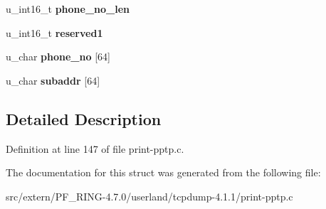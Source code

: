 \begin{DoxyCompactItemize}
\item 
\hypertarget{structpptp__msg__ocrq_a3cafb2efb818633c4bdeeb138cfbe914}{
u\_\-int16\_\-t {\bfseries phone\_\-no\_\-len}}
\label{structpptp__msg__ocrq_a3cafb2efb818633c4bdeeb138cfbe914}

\item 
\hypertarget{structpptp__msg__ocrq_a12994a612bcee3c23eef93816e906e11}{
u\_\-int16\_\-t {\bfseries reserved1}}
\label{structpptp__msg__ocrq_a12994a612bcee3c23eef93816e906e11}

\item 
\hypertarget{structpptp__msg__ocrq_a2477198bb6fd938a4d85ed19801f440a}{
u\_\-char {\bfseries phone\_\-no} \mbox{[}64\mbox{]}}
\label{structpptp__msg__ocrq_a2477198bb6fd938a4d85ed19801f440a}

\item 
\hypertarget{structpptp__msg__ocrq_a8653e3a9aea43897b1aafbdc08ef54a1}{
u\_\-char {\bfseries subaddr} \mbox{[}64\mbox{]}}
\label{structpptp__msg__ocrq_a8653e3a9aea43897b1aafbdc08ef54a1}

\end{DoxyCompactItemize}


\subsection{Detailed Description}


Definition at line 147 of file print-\/pptp.c.



The documentation for this struct was generated from the following file:\begin{DoxyCompactItemize}
\item 
src/extern/PF\_\-RING-\/4.7.0/userland/tcpdump-\/4.1.1/print-\/pptp.c\end{DoxyCompactItemize}
